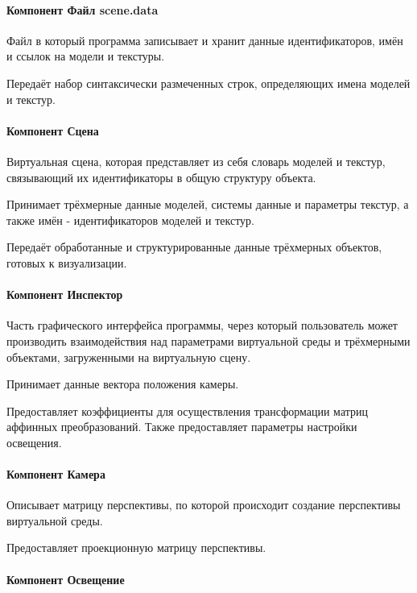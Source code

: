 \paragraph{Компонент Файл scene.data}

Файл в который программа записывает и хранит данные идентификаторов, имён и ссылок на модели и текстуры.

Передаёт набор синтаксически размеченных строк, определяющих имена моделей и текстур.

\paragraph{Компонент Сцена}

Виртуальная сцена, которая представляет из себя словарь моделей и текстур, связывающий их идентификаторы в общую структуру объекта.

Принимает трёхмерные данные моделей, системы данные и параметры текстур, а также имён - идентификаторов моделей и текстур.

Передаёт обработанные и структурированные данные трёхмерных объектов, готовых к визуализации.

\paragraph{Компонент Инспектор}

Часть графического интерфейса программы, через который пользователь может производить взаимодействия над параметрами виртуальной среды и трёхмерными объектами, загруженными на виртуальную сцену.

Принимает данные вектора положения камеры.

Предоставляет коэффициенты для осуществления трансформации матриц аффинных преобразований. Также предоставляет параметры настройки освещения.

\paragraph{Компонент Камера}

Описывает матрицу перспективы, по которой происходит создание перспективы виртуальной среды.

Предоставляет проекционную матрицу перспективы.

\paragraph{Компонент Освещение}

